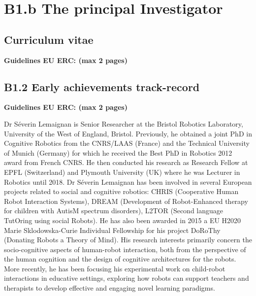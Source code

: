 \documentclass[]{article}
\newcommand{\eu}[1]{{\color{teal}\textbf{Guidelines EU ERC: #1}}}
\begin{document}
\newpage

\section{B1.b The principal Investigator}\label{the-principal-investigator}

\hypertarget{curriculum-vitae}{%
\subsection{Curriculum vitae}\label{curriculum-vitae}}

\eu{(max 2 pages)}

\newpage
\subsection{B1.2 Early achievements track-record}\label{early-achievements-track-record}

\eu{(max 2 pages)}

Dr Séverin Lemaignan is Senior Researcher at the Bristol Robotics
Laboratory, University of the West of England, Bristol. Previously, he
obtained a joint PhD in Cognitive Robotics from the CNRS/LAAS (France)
and the Technical University of Munich (Germany) for which he received
the Best PhD in Robotics 2012 award from French CNRS. He then conducted
his research as Research Fellow at EPFL (Switzerland) and Plymouth
University (UK) where he was Lecturer in Robotics until 2018. Dr Séverin
Lemaignan has been involved in several European projects related to
social and cognitive robotics: CHRIS (Cooperative Human Robot
Interaction Systems), DREAM (Development of Robot-Enhanced therapy for
children with AutisM spectrum disorders), L2TOR (Second language
TutOring using social Robots). He has also been awarded in 2015 a EU
H2020 Marie Sklodowska-Curie Individual Fellowship for his project
DoRoThy (Donating Robots a Theory of Mind). His research interests
primarily concern the socio-cognitive aspects of human-robot
interaction, both from the perspective of the human cognition and the
design of cognitive architectures for the robots. More recently, he has
been focusing his experimental work on child-robot interactions in
educative settings, exploring how robots can support teachers and
therapists to develop effective and engaging novel learning paradigms.
\end{document}
